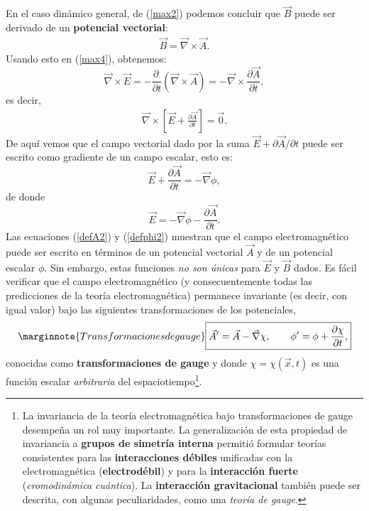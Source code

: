 En el caso dinámico general, de (\ref{max2}) podemos concluir que $\vec{B}$
puede ser derivado de un \textbf{potencial vectorial}:
\begin{eqnarray}\label{defA2}
\boxed{\vec{B}=\vec{\nabla}\times \vec{A}.}
\end{eqnarray}
Usando esto en (\ref{max4}), obtenemos:
\begin{equation}
\vec{\nabla}\times \vec{E} = -  \frac{\partial\ }{\partial
t}(\vec{\nabla}\times\vec{A}) = -\vec{\nabla}\times
\frac{\partial\vec{A}}{\partial t},
\end{equation}
es decir,
\begin{eqnarray}
\vec{\nabla}\times \left[ \vec{E} + \frac{\partial \vec{A}}{\partial t} \right]
= \vec{0}.
\end{eqnarray}
De aquí vemos que el campo vectorial dado por la suma $\vec{E} + {\partial
\vec{A}}/{\partial t}$ puede ser escrito como gradiente de un campo escalar, esto es:
\begin{equation}
\vec{E} + \frac{\partial \vec{A}}{\partial t}= - \vec{\nabla}\phi ,
\end{equation}
de donde
\begin{equation}\label{defphi2}
\boxed{\vec{E} =   - \vec{\nabla}\phi - \frac{\partial \vec{A}}{\partial t}.}
\end{equation}
Las ecuaciones (\ref{defA2}) y (\ref{defphi2}) muestran que el campo
electromagnético puede ser escrito en términos de un potencial vectorial
$\vec{A}$ y de un potencial escalar $\phi$. Sin embargo, estas funciones
\textit{no son únicas} para $\vec{E}$ y $\vec{B}$ dados. Es fácil verificar
que el campo electromagnético (y consecuentemente todas las predicciones de la
teoría electromagnética) permanece invariante (es decir, con igual valor) bajo las
siguientes transformaciones de los potenciales,
\begin{equation}\marginnote{Transformaciones de gauge}\label{tgg}
\boxed{{\vec{A}}' = \vec{A} - \vec{\nabla}{\chi}, \qquad \phi' =\phi +
\frac{\partial \chi}{\partial t},}
\end{equation}
conocidas como \textbf{transformaciones de gauge} y donde $\chi=\chi(\vec{x},t)$
es una función escalar \textit{arbitraria} del espaciotiempo\footnote{La invariancia
de la teoría electromagnética bajo transformaciones de gauge
desempeña un rol muy importante. La generalización de esta propiedad de
invariancia a \textbf{grupos de simetría interna} permitió formular
teorías consistentes para las \textbf{interacciones débiles} unificadas con la electromagnética (\textbf{electrodébil}) y para la \textbf{interacción fuerte}
(\textit{cromodinámica cuántica}). La \textbf{interacción gravitacional} también puede ser descrita, con algunas peculiaridades, como una \textit{teoría de gauge}.}.

